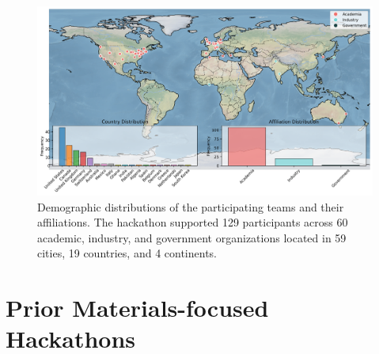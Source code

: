 \documentclass[superscriptaddress, nofootinbib,  amsmath, amssymb, twocolumn]{revtex4-2} %
\begin{document}
\begin{figure}
    \centering
    \includegraphics[width=0.95\linewidth]{latex/figures/world_map.png}
    \caption{Demographic distributions of the participating teams and their affiliations. The hackathon supported 129 participants across 60 academic, industry, and government organizations located in 59 cities, 19 countries, and 4 continents. \label{fig:map} }
\end{figure}






\section{Prior Materials-focused Hackathons}
\end{document}
